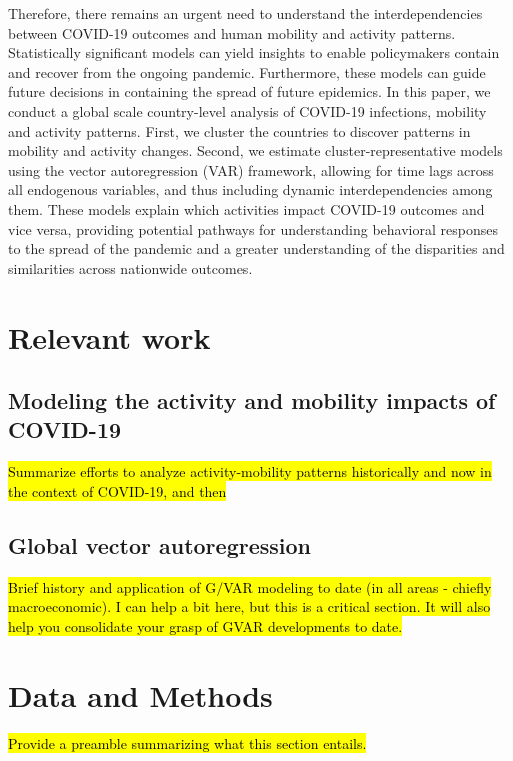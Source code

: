 \documentclass[preprint, 11pt]{elsarticle}
\newcommand{\?}{\stackrel{?}{=}}
\begin{document}
Therefore, there remains an urgent need to understand the interdependencies between COVID-19 outcomes and human mobility and activity patterns.
Statistically significant models can yield insights to enable policymakers contain and recover from the ongoing pandemic.
Furthermore, these models can guide future decisions in containing the spread of future epidemics.
In this paper, we conduct a global scale country-level analysis of COVID-19 infections,  mobility and activity patterns.
First, we cluster the countries to discover patterns in mobility and activity changes.
Second, we estimate cluster-representative models using the vector autoregression (VAR) framework, allowing for time lags across all endogenous variables, and thus including dynamic interdependencies among them.
These models explain which activities impact COVID-19 outcomes and vice versa, providing potential pathways for understanding behavioral responses to the spread of the pandemic and a greater understanding of the disparities and similarities across nationwide outcomes.



\section{Relevant work}
\subsection{Modeling the activity and mobility impacts of COVID-19}

\hl{Summarize efforts to analyze activity-mobility patterns historically and now in the context of
  COVID-19, and then}
  
\subsection{Global vector autoregression}
\hl{Brief history and application of G/VAR modeling to date (in all areas - chiefly macroeconomic). I can help a bit
  here, but this is a critical section. It will also help you consolidate your grasp of GVAR developments to date.}

\section{Data and Methods}
\hl{Provide a preamble summarizing what this section entails.}
\end{document}
